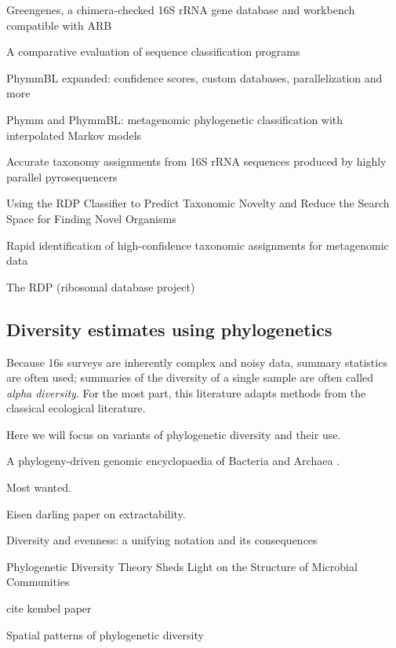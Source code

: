 \documentclass{amsart}
\begin{document}
\cite{desantis2006greengenes}
{Greengenes, a chimera-checked 16S rRNA gene database and workbench compatible with ARB}

\cite{bazinet2012comparative}
A comparative evaluation of sequence classification programs

\cite{brady2011phymmbl}
PhymmBL expanded: confidence scores, custom databases, parallelization and more

\cite{brady2009phymm}
Phymm and PhymmBL: metagenomic phylogenetic classification with interpolated Markov models

\cite{ColeEaRDP2009}

\cite{liu2008accurate}
Accurate taxonomy assignments from 16S rRNA sequences produced by highly parallel pyrosequencers

\cite{lan2012using}
Using the RDP Classifier to Predict Taxonomic Novelty and Reduce the Search Space for Finding Novel Organisms

\cite{macdonald2012rapid}
Rapid identification of high-confidence taxonomic assignments for metagenomic data

\cite{maidak1997rdp}
The RDP (ribosomal database project)


\subsection{Diversity estimates using phylogenetics}

Because 16s surveys are inherently complex and noisy data, summary statistics are often used; summaries of the diversity of a single sample are often called \emph{alpha diversity}.
For the most part, this literature adapts methods from the classical ecological literature.

Here we will focus on variants of phylogenetic diversity and their use.



A phylogeny-driven genomic encyclopaedia of Bacteria and Archaea \cite{wu2009phylogeny}.

Most wanted.

Eisen darling paper on extractability.

\cite{hill1973diversity}
Diversity and evenness: a unifying notation and its consequences


\cite{odwyer2012phylogenetic}
Phylogenetic Diversity Theory Sheds Light on the Structure of Microbial Communities

cite kembel paper

\cite{morlon2011spatial}
Spatial patterns of phylogenetic diversity
\end{document}
